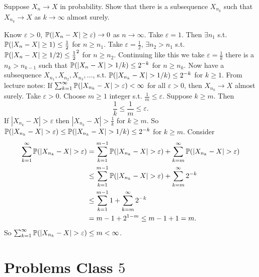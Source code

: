 \documentclass[10pt, a4paper]{article}
\begin{document}
\begin{problem}
    Suppose $X_n \to X$ in probability.
    Show that there is a subsequence $X_{n_k}$ such that $X_{n_k} \to X$ as $k \to \infty$ almost surely.

    \begin{solution}
        Know $\varepsilon > 0$,
        $\P(|X_n - X| \geq \varepsilon) \to 0$ as $n \to \infty$.
        Take $\varepsilon = 1$.
        Then $\exists n_1$ s.t. $\P(|X_n - X| \geq 1) \leq \frac{1}{2}$ for $n \geq n_1$.
        Take $\varepsilon = \frac{1}{2}$,
        $\exists n_2 > n_1$ s.t. $\P(|X_n - X| \geq 1 / 2) \leq \frac{1}{2} ^ 2$ for $n \geq n_2$.
        Continuing like this we take $\varepsilon = \frac{1}{k}$ there is a $n_k > n_{k - 1}$ such that $\P(|X_n - X| > 1 / k) \leq 2 ^ {-k}$ for $n \geq n_k$.
        Now have a subsequence $X_{n_1}, X_{n_2}, X_{n_3}, \dotsc$,
        s.t. $\P(|X_{n_k} - X| > 1 / k) \leq 2 ^ {-k}$ for $k \geq 1$.
        From lecture notes:
        If $\sum_{k = 1}^{\infty}\P(|X_{n_k} - X| > \varepsilon) < \infty$ for all $\varepsilon > 0$,
        then $X_{n_k} \to X$ almost surely.
        Take $\varepsilon > 0$.
        Choose $m \geq 1$ integer s.t. $\frac{1}{m} \leq \varepsilon$.
        Suppose $k \geq m$.
        Then
        \[
        \frac{1}{k} \leq \frac{1}{m} \leq \varepsilon.
        \]
        If $|X_{n_k} - X| > \varepsilon$ then $|X_{n_k} - X| > \frac{1}{k}$ for $k \geq m$.
        So $\P(|X_{n_k} - X| > \varepsilon) \leq \P(|X_{n_k} - X| > 1 / k) \leq 2 ^ {-k}$  for $k \geq m$.
        Consider
        \begin{align*}
            \sum_{k = 1}^{\infty}\P(|X_{n_k} - X| > \varepsilon) &= \sum_{k = 1}^{m - 1}\P(|X_{n_k} - X| > \varepsilon) + \sum_{k = m}^{\infty}\P(|X_{n_k} - X| > \varepsilon) \\
            &\leq \sum_{k = 1}^{m - 1}\P(|X_{n_k} - X| > \varepsilon) + \sum_{k = m}^{\infty}2 ^ {-k} \\
            &\leq \sum_{k = 1}^{m - 1}1 + \sum_{k = m}^{\infty}2 ^ {-k} \\
            &= m - 1 + 2 ^ {1 - m} \leq m - 1 + 1 = m.
        \end{align*}
        So $\sum_{k = 1}^{\infty}\P(|X_{n_k} - X| > \varepsilon) \leq m < \infty$.
    \end{solution}
\end{problem}

\newpage

\section{Problems Class \texorpdfstring{$5$}{}}
\end{document}
